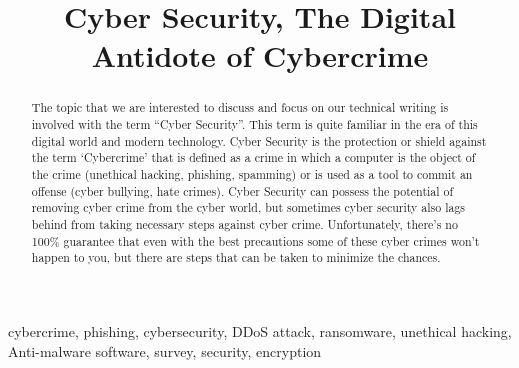 \documentclass[conference]{IEEEtran}
\begin{document}
	
	\title{Cyber Security, The Digital Antidote of Cybercrime}
	\author{}
	
	\maketitle


	\begin{abstract}
		The topic that we are interested to discuss and focus on our technical writing is involved with the term “Cyber Security”. This term is quite familiar in the era of this digital world and modern technology. Cyber Security is the protection or shield against the term ‘Cybercrime’ that is defined as a crime in which a computer is the object of the crime (unethical hacking, phishing, spamming) or is used as a tool to commit an offense (cyber bullying, hate crimes). Cyber Security can possess the potential of removing cyber crime from the cyber world, but sometimes cyber security also lags behind from taking necessary steps against cyber crime. Unfortunately, there's no 100\% guarantee that even with the best precautions some of these cyber crimes won't happen to you, but there are steps that can be taken to minimize the chances.
	\end{abstract}
	
	\begin{IEEEkeywords}
		cybercrime, phishing, cybersecurity, DDoS attack, ransomware, unethical hacking, Anti-malware software, survey, security, encryption
	\end{IEEEkeywords}
	
\end{document}

